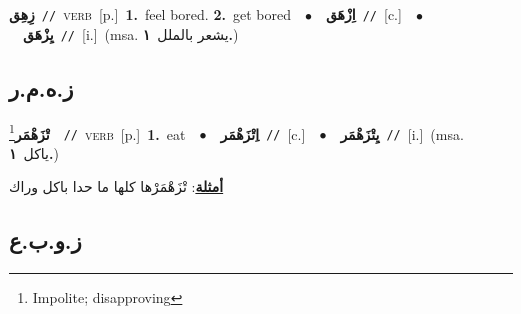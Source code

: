 \documentclass[10pt,a4paper,twoside]{article} %
\begin{document}
\begin{multicols}{2}
{\setlength\topsep{0pt}\textbf{\foreignlanguage{arabic}{زِهِق}}\ {\color{gray}\texttt{//}\color{black}}\ \textsc{verb}\ [p.]\ \textbf{1.}~feel bored.  \textbf{2.}~get bored\ \ $\bullet$\ \ \setlength\topsep{0pt}\textbf{\foreignlanguage{arabic}{اِزْهَق}}\ {\color{gray}\texttt{//}\color{black}}\ [c.]\ \ $\bullet$\ \ \setlength\topsep{0pt}\textbf{\foreignlanguage{arabic}{يِزْهَق}}\ {\color{gray}\texttt{//}\color{black}}\ [i.]\ \color{gray}(msa. \foreignlanguage{arabic}{يشعر بالملل}~\foreignlanguage{arabic}{\textbf{١.}})\color{black}\ } \vspace{2mm}

\vspace{-3mm}
\subsection*{\color{blue}\foreignlanguage{arabic}{ز.ه.م.ر}\color{blue}{}} 

{\setlength\topsep{0pt}\textbf{\foreignlanguage{arabic}{تْزَهْمَر}}\footnote{Impolite; disapproving}\ \ {\color{gray}\texttt{//}\color{black}}\ \textsc{verb}\ [p.]\ \textbf{1.}~eat\ \ $\bullet$\ \ \setlength\topsep{0pt}\textbf{\foreignlanguage{arabic}{اِتْزَهْمَر}}\ {\color{gray}\texttt{//}\color{black}}\ [c.]\ \ $\bullet$\ \ \setlength\topsep{0pt}\textbf{\foreignlanguage{arabic}{يِتْزَهْمَر}}\ {\color{gray}\texttt{//}\color{black}}\ [i.]\ \color{gray}(msa. \foreignlanguage{arabic}{ياكل}~\foreignlanguage{arabic}{\textbf{١.}})\color{black}\  \begin{flushright}\color{gray}\foreignlanguage{arabic}{\textbf{\underline{\foreignlanguage{arabic}{أمثلة}}}: تْزَهْمَرْها كلها ما حدا باكل وراك}\end{flushright}\color{black}} \vspace{2mm}

\vspace{-3mm}
\subsection*{\color{blue}\foreignlanguage{arabic}{ز.و.ب.ع}\color{blue}{}} 


\end{multicols}
\end{document}
